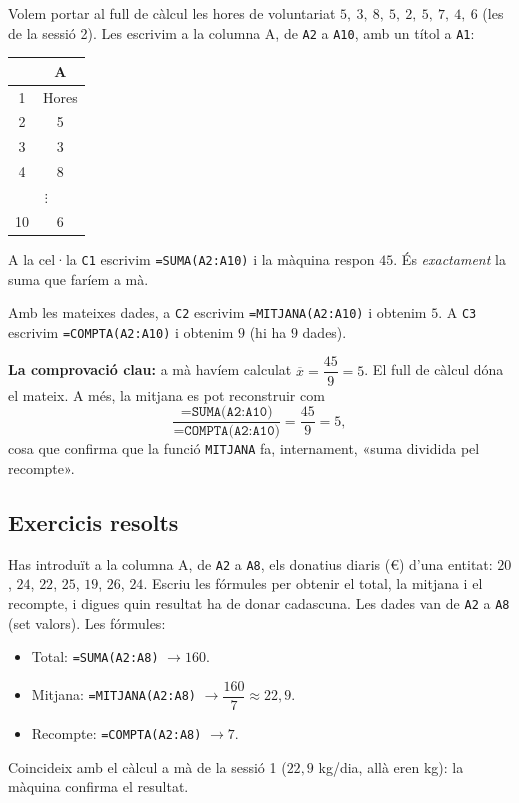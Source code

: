 \begin{exemple}
Volem portar al full de càlcul les hores de voluntariat $5,\ 3,\ 8,\ 5,\ 2,\ 5,\ 7,\ 4,\ 6$
(les de la sessió 2). Les escrivim a la columna A, de \texttt{A2} a \texttt{A10},
amb un títol a \texttt{A1}:

\begin{center}
\begin{tabular}{c|c}
 & \textbf{A} \\
\hline
1 & Hores \\
2 & 5 \\
3 & 3 \\
4 & 8 \\
\multicolumn{2}{c}{\quad$\vdots$\quad} \\
10 & 6 \\
\end{tabular}
\end{center}

A la cel·la \texttt{C1} escrivim \texttt{=SUMA(A2:A10)} i la màquina respon $45$.
És \emph{exactament} la suma que faríem a mà.
\end{exemple}

\begin{exemple}
Amb les mateixes dades, a \texttt{C2} escrivim \texttt{=MITJANA(A2:A10)} i obtenim
$5$. A \texttt{C3} escrivim \texttt{=COMPTA(A2:A10)} i obtenim $9$ (hi ha $9$ dades).

\textbf{La comprovació clau:} a mà havíem calculat $\overline{x}=\dfrac{45}{9}=5$. El
full de càlcul dóna el mateix. A més, la mitjana es pot reconstruir com
\[
\frac{\texttt{=SUMA(A2:A10)}}{\texttt{=COMPTA(A2:A10)}}=\frac{45}{9}=5,
\]
cosa que confirma que la funció \texttt{MITJANA} fa, internament, «suma dividida pel
recompte».
\end{exemple}

\subsection{Exercicis resolts}

\begin{exresolt}
Has introduït a la columna A, de \texttt{A2} a \texttt{A8}, els donatius diaris (€)
d'una entitat: $20$, $24$, $22$, $25$, $19$, $26$, $24$. Escriu les fórmules per
obtenir el total, la mitjana i el recompte, i digues quin resultat ha de donar
cadascuna.
\solucio
Les dades van de \texttt{A2} a \texttt{A8} (set valors). Les fórmules:
\begin{itemize}[leftmargin=1.4em, itemsep=1pt]
  \item Total: \texttt{=SUMA(A2:A8)} $\rightarrow 160$.
  \item Mitjana: \texttt{=MITJANA(A2:A8)} $\rightarrow \dfrac{160}{7}\approx 22,9$.
  \item Recompte: \texttt{=COMPTA(A2:A8)} $\rightarrow 7$.
\end{itemize}
Coincideix amb el càlcul a mà de la sessió 1 ($22,9$ kg/dia, allà eren kg): la
màquina confirma el resultat.
\end{exresolt}

